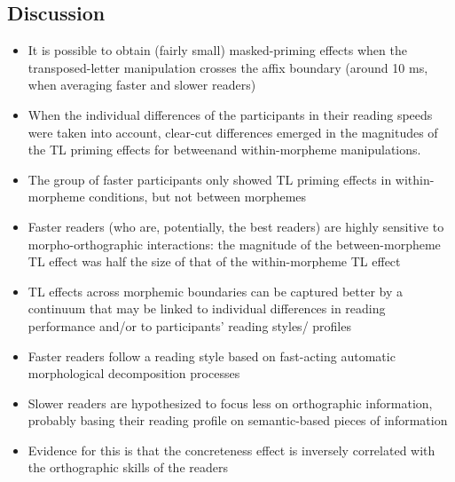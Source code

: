 \documentclass[]{article}
\begin{document}
		\subsection{Discussion}
		\begin{itemize}
			\item It is possible to obtain (fairly small) masked-priming effects when the transposed-letter manipulation crosses the affix boundary (around 10 ms, when averaging faster and slower readers)
			\item When the individual differences of the participants in their reading speeds were taken into account, clear-cut differences emerged in the magnitudes of the TL priming effects for betweenand within-morpheme manipulations.
			\item The group of faster participants only showed TL priming effects in within-morpheme conditions, but not between morphemes
			\item Faster readers (who are, potentially, the best readers) are highly sensitive to morpho-orthographic interactions: the magnitude of the between-morpheme TL effect was half the size of that of the within-morpheme TL effect
			\item  TL effects across morphemic boundaries can be captured better by a continuum that may be linked to individual differences in reading performance and/or to participants’ reading styles/ profiles
			\item Faster readers follow a reading style based on fast-acting automatic morphological decomposition processes
			\item  Slower readers are hypothesized to focus less on orthographic information, probably basing their reading profile on semantic-based pieces of information
			\item Evidence for this is that the concreteness effect is inversely correlated with the orthographic skills of the readers
		\end{itemize}
		
	
	
		
	
\end{document}
